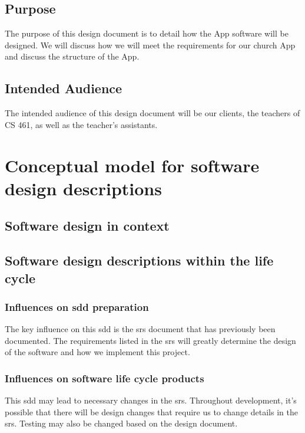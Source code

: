 \documentclass[letterpaper,10pt,draftclsnofoot,onecolumn,titlepage]{IEEEtran}
\begin{document}
		\subsection{Purpose}
			The purpose of this design document is to detail how the \gls{App} software will be designed.
			We will discuss how we will meet the requirements for our church \gls{App} and discuss the structure of the \gls{App}.
		\subsection{Intended Audience}
			The intended audience of this design document will be our clients, the teachers of CS 461, as well as the teacher's assistants.

		\printglossaries


	\section{Conceptual model for software design descriptions}

		\subsection{Software design in context}

		\subsection{Software design descriptions within the life cycle}


			\subsubsection{Influences on \gls{sdd} preparation}
				The key influence on this \gls{sdd} is the \gls{srs} document that has previously been documented.
				The requirements listed in the \gls{srs} will greatly determine the design of the software and how we implement this project.

			\subsubsection{Influences on software life cycle products}
				This \gls{sdd} may lead to necessary changes in the \gls{srs}.
				Throughout development, it's possible that there will be design changes that require us to change details in the \gls{srs}.
				Testing may also be changed based on the design document.
\end{document}

